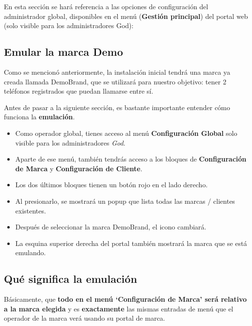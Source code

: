 \documentclass[letterpaper,10pt,spanish]{sphinxmanual}
\begin{document}
En esta sección se hará referencia a las opciones de configuración del administrador global, disponibles en el menú (\textbf{Gestión principal}) del portal web (solo visible para los administradores God):


\subsection{Emular la marca Demo}
\label{getting_started/internal_calls/god_portal:emulate-the-demo-brand}
Como se mencionó anteriormente, la instalación inicial tendrá una marca ya creada llamada DemoBrand, que se utilizará para nuestro objetivo: tener 2 teléfonos registrados que puedan llamarse entre sí.

Antes de pasar a la siguiente sección, es bastante importante entender cómo funciona la \textbf{emulación}.
\begin{itemize}
\item {} 
Como operador global, tienes acceso al menú \textbf{Configuración Global} solo visible para los administradores \emph{God}.

\item {} 
Aparte de ese menú, también tendrás acceso a los bloques de \textbf{Configuración de Marca} y \textbf{Configuración de Cliente}.

\item {} 
Los dos últimos bloques tienen un botón rojo en el lado derecho.

\item {} 
Al presionarlo, se mostrará un popup que lista todas las marcas / clientes existentes.

\item {} 
Después de seleccionar la marca DemoBrand, el icono cambiará.

\item {} 
La esquina superior derecha del portal también mostrará la marca que se está emulando.

\end{itemize}


\subsection{Qué significa la emulación}
\label{getting_started/internal_calls/god_portal:what-emulation-means}
Básicamente, que \textbf{todo en el menú `Configuración de Marca' será relativo a la marca elegida} y es \textbf{exactamente} las mismas entradas de menú que el operador de la marca verá usando su portal de marca.
\end{document}
